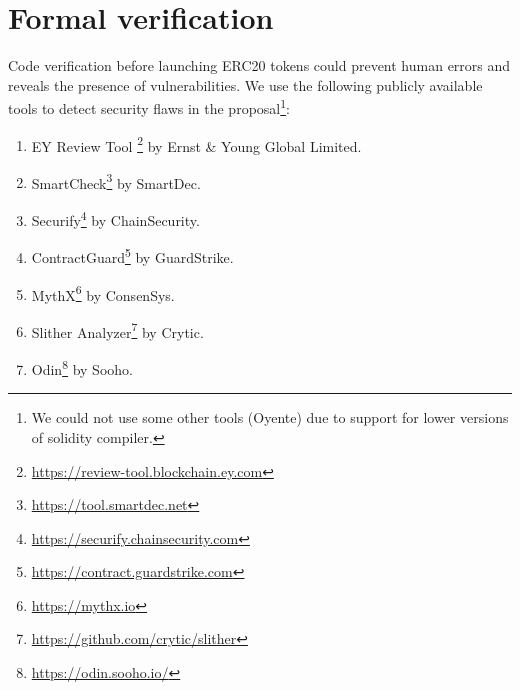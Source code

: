 
\section{Formal verification}\label{section:ver}






Code verification before launching ERC20 tokens could prevent human errors and reveals the presence of vulnerabilities. We use the following publicly available tools \cite{AuditTools} to detect security flaws in the proposal\footnote{We could not use some other tools (\eg Oyente) due to support for lower versions of solidity compiler.}:
\begin{enumerate}
	\item EY Review Tool \footnote{\url{https://review-tool.blockchain.ey.com}} by Ernst \& Young Global Limited.
	\item SmartCheck\footnote{\url{https://tool.smartdec.net}} by SmartDec.
	\item Securify\footnote{\url{https://securify.chainsecurity.com}} by ChainSecurity.
	\item ContractGuard\footnote{\url{https://contract.guardstrike.com}} by GuardStrike.
	\item MythX\footnote{\url{https://mythx.io}} by ConsenSys.
	\item Slither Analyzer\footnote{\url{https://github.com/crytic/slither}} by Crytic.
	\item Odin\footnote{\url{https://odin.sooho.io/}} by Sooho.
\end{enumerate}

